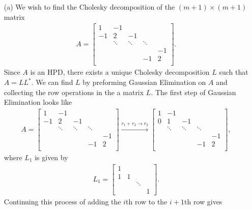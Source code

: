 \documentclass[12pt]{report}
\begin{document}
\begin{solution}
    \noindent
    \begin{enumerate}
      \item [(a)]
      We wish to find the Cholesky decomposition of the $(m+1) \times (m+1)$ matrix
      \begin{align*}
        A = \begin{bmatrix} 
          1 & -1 \\ -1 & 2 &-1 \\
        & \ddots & \ddots & \ddots \\
        &&&& -1\\
          &&&-1& 2\\
        \end{bmatrix}.
      \end{align*}
      Since $A$ is an HPD, there exists a unique Cholesky decomposition $L$ such that $A = LL^*$. We can find $L$ by preforming Gaussian Elimination on $A$ and collecting the row operations in the a matrix $L$. The first step of Gaussian Elimination looks like
      \begin{align*}
        A = \begin{bmatrix} 1 & -1 \\ -1 & 2 &-1 \\
          & \ddots & \ddots & \ddots \\
          &&&& -1\\
          &&&-1& 2\\
        \end{bmatrix} \xrightarrow{r_1 + r_{2} \rightarrow r_{2}} \begin{bmatrix} 1 & -1 \\ 0 & 1 &-1 \\
          & \ddots & \ddots & \ddots \\
          &&&& -1\\
          &&&-1& 2\\
        \end{bmatrix},
      \end{align*}
      where $L_1$ is given by
      \begin{align*}
        L_1 = \begin{bmatrix}
          1 & \\
          1 & 1\\
          && \ddots\\
          &&&1
        \end{bmatrix}.
      \end{align*}
      Continuing this process of adding the $i$th row to the $i+1$th row gives

\end{enumerate}
\end{solution}
\end{document}
